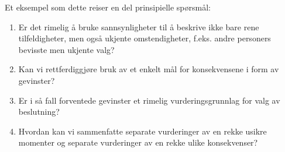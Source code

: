 Et eksempel som dette reiser en del prinsipielle spørsmål:

\begin{enumerate}
\item  Er det rimelig å bruke sannsynligheter til å beskrive ikke 
       bare rene tilfeldigheter, men også ukjente omstendigheter, 
       f.eks. andre personers bevisste men ukjente valg?
\item  Kan vi rettferdiggjøre bruk av et enkelt mål for 
       konsekvensene i form av gevinster?
\item  Er i så fall forventede gevinster et rimelig vurderingsgrunnlag
       for valg av beslutning?
\item  Hvordan kan vi sammenfatte separate vurderinger av en rekke 
       usikre momenter og separate vurderinger av en rekke ulike konsekvenser?
\end{enumerate}
